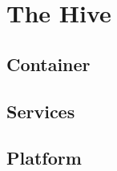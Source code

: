 \section{The Hive}


\subsection{Container} %





\subsection{Services} %





\subsection{Platform} %






